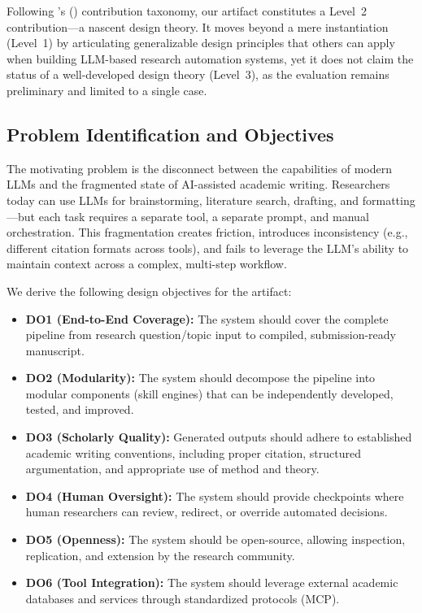 \documentclass{article}
\begin{document}
Following \citeauthor{gregor2013positioning}'s (\citeyear{gregor2013positioning}) contribution taxonomy, our artifact constitutes a Level~2 contribution---a nascent design theory. It moves beyond a mere instantiation (Level~1) by articulating generalizable design principles that others can apply when building LLM-based research automation systems, yet it does not claim the status of a well-developed design theory (Level~3), as the evaluation remains preliminary and limited to a single case.

\subsection{Problem Identification and Objectives}

The motivating problem is the disconnect between the capabilities of modern LLMs and the fragmented state of AI-assisted academic writing. Researchers today can use LLMs for brainstorming, literature search, drafting, and formatting---but each task requires a separate tool, a separate prompt, and manual orchestration. This fragmentation creates friction, introduces inconsistency (e.g., different citation formats across tools), and fails to leverage the LLM's ability to maintain context across a complex, multi-step workflow.

We derive the following design objectives for the artifact:

\begin{itemize}
    \item \textbf{DO1 (End-to-End Coverage):} The system should cover the complete pipeline from research question/topic input to compiled, submission-ready manuscript.
    \item \textbf{DO2 (Modularity):} The system should decompose the pipeline into modular components (skill engines) that can be independently developed, tested, and improved.
    \item \textbf{DO3 (Scholarly Quality):} Generated outputs should adhere to established academic writing conventions, including proper citation, structured argumentation, and appropriate use of method and theory.
    \item \textbf{DO4 (Human Oversight):} The system should provide checkpoints where human researchers can review, redirect, or override automated decisions.
    \item \textbf{DO5 (Openness):} The system should be open-source, allowing inspection, replication, and extension by the research community.
    \item \textbf{DO6 (Tool Integration):} The system should leverage external academic databases and services through standardized protocols (MCP).
\end{itemize}
\end{document}
